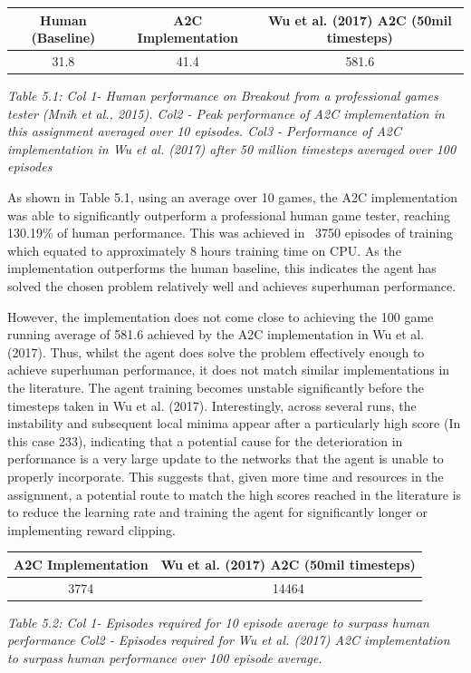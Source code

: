 \documentclass{article}
\begin{document}
\begin{table}[h!]
\centering
\begin{tabular}{|c | c | c |} 
 \hline
 Human (Baseline) & A2C Implementation & Wu et al. (2017) A2C (50mil timesteps) \\ [0.5ex] 
 \hline
 31.8 & 41.4 & 581.6  \\ 
 \hline
\end{tabular}
\end{table}
\emph{Table 5.1: Col 1- Human performance on Breakout from a professional games tester (Mnih et al., 2015). Col2 - Peak performance of A2C implementation in this assignment averaged over 10 episodes. Col3 - Performance of A2C implementation in Wu et al. (2017)  after 50 million timesteps averaged over 100 episodes}

As shown in Table 5.1, using an average over 10 games, the A2C implementation was able to significantly outperform a professional human game tester, reaching 130.19\% of human performance. This was achieved in ~3750 episodes of training which equated to approximately 8 hours training time on CPU. As the implementation outperforms the human baseline, this indicates the agent has solved the chosen problem relatively well and achieves superhuman performance.

However, the implementation does not come close to achieving the 100 game running average of 581.6 achieved by the A2C implementation in Wu et al. (2017). Thus, whilst the agent does solve the problem effectively enough to achieve superhuman performance, it does not match similar implementations in the literature. The agent training becomes unstable significantly before the timesteps taken in Wu et al. (2017). Interestingly, across several runs, the instability and subsequent local minima appear after a particularly high score (In this case 233), indicating that a potential cause for the deterioration in performance is a very large update to the networks that the agent is unable to properly incorporate. This suggests that, given more time and resources in the assignment, a potential route to match the high scores reached in the literature is to reduce the learning rate and training the agent for significantly longer or implementing reward clipping.

\begin{table}[h!]
\centering
\begin{tabular}{|c | c|} 
 \hline
 A2C Implementation & Wu et al. (2017) A2C (50mil timesteps) \\ [0.5ex] 
 \hline
 3774 & 14464   \\ 
 \hline
\end{tabular}
\end{table}
\emph{Table 5.2: Col 1- Episodes required for 10 episode average to surpass human performance Col2 - Episodes required for Wu et al. (2017) A2C implementation to surpass human performance over 100 episode average.}
\end{document}
